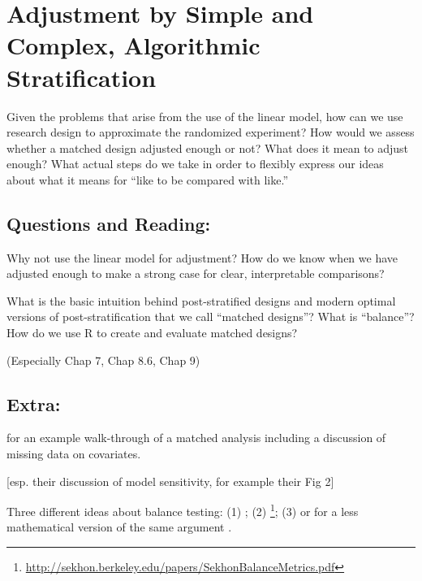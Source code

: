 \documentclass[10pt, letterpaper]{article}
\begin{document}
\AdvanceDate[1]
\section{Adjustment by Simple and Complex, Algorithmic Stratification }

Given the problems that arise from the use of the linear model, how can we use
research design to approximate the randomized experiment? How would we assess
whether a matched design adjusted enough or not? What does it mean to adjust
enough? What actual steps do we take in order to flexibly express our ideas
about what it means for ``like to be compared with like.''

\subsection{Questions and Reading:}

Why not use the linear model for adjustment? How do we know when we have
adjusted enough to make a strong case for clear, interpretable comparisons?

\citealp[Chap 6]{rosenbaum2010design}

\citealp[Chap 9.5--9.6]{gelman2007dau}

What is the basic intuition behind post-stratified designs and modern optimal
versions of post-stratification that we call ``matched designs''? What is
``balance''? How do we use R to create and evaluate matched designs?

\citealp[Chap 7--9, 13]{rosenbaum2010design} (Especially Chap 7, Chap 8.6,
Chap 9)

\subsection{Extra:}

\citealp[Chap 3]{rosenbaum2010design} 

\cite{hansen:2004a}

\cite{hansen2011propensity} for an example walk-through of a matched analysis
including a discussion of missing data on covariates.

\cite{ho2007man} [esp. their discussion of model sensitivity, for
example their Fig 2]

Three different ideas about balance testing: (1) \cite{imai2008mae}; (2)
\cite{sekhon2007alternative}\footnote{
  \url{http://sekhon.berkeley.edu/papers/SekhonBalanceMetrics.pdf}}; (3)
\cite{hansen2008cbs} \cite{hansen:statmed:2008} or for a less mathematical
version of the same argument \cite[\S 3]{bowers2011mem}.
\end{document}
